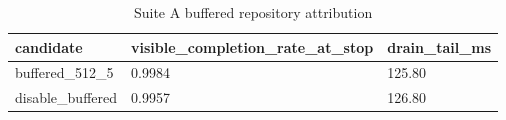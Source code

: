 \begin{table}[htbp]
\centering
\caption{Suite A buffered repository attribution}
\begin{tabular}{lll}
\hline
candidate & visible\_completion\_rate\_at\_stop & drain\_tail\_ms \\
\hline
buffered\_512\_5 & 0.9984 & 125.80 \\
disable\_buffered & 0.9957 & 126.80 \\
\hline
\end{tabular}
\end{table}
